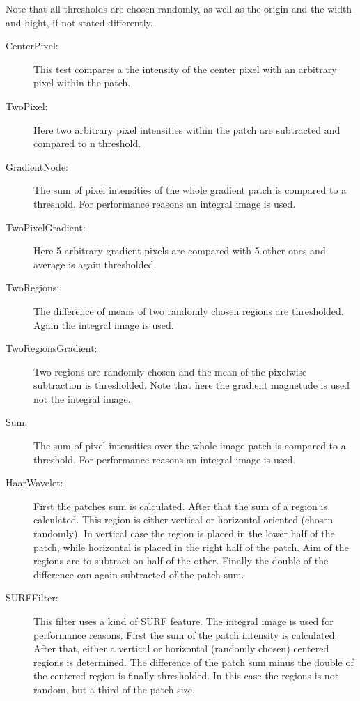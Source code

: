 Note that all thresholds are chosen randomly, as well as the origin and the width and hight, if not stated differently.

\FloatBarrier
\begin{description}
\item[CenterPixel:]
This test compares a the intensity of the center pixel with an arbitrary pixel within the patch.

\item[TwoPixel:]
Here two arbitrary pixel intensities within the patch are subtracted and compared to n threshold.

\item[GradientNode:]
The sum of pixel intensities of the whole gradient patch is compared to a threshold. For performance reasons an integral image is used. 

\item[TwoPixelGradient:]
Here 5 arbitrary gradient pixels are compared with 5 other ones and average is again thresholded.

\item[TwoRegions:]
The difference of means of two randomly chosen regions are thresholded. Again the integral image is used.

\item[TwoRegionsGradient:]
Two regions are randomly chosen and the mean of the pixelwise subtraction is thresholded. Note that here the gradient magnetude is used not the integral image.

\item[Sum:]
The sum of pixel intensities over the whole image patch is compared to a threshold. For performance reasons an integral image is used.

\item[HaarWavelet:]
First the patches sum is calculated. After that the sum of a region is calculated. This region is either vertical or horizontal oriented (chosen randomly). In vertical case the region is placed in the lower half of the patch, while horizontal is placed in the right half of the patch. Aim of the regions are to subtract on half of the other. Finally the double of the difference can again subtracted of the patch sum.

\item[SURFFilter:]
This filter uses a kind of SURF feature. The integral image is used for performance reasons. First the sum of the patch intensity is calculated. After that, either a vertical or horizontal (randomly chosen) centered regions is determined. The difference of the patch sum minus the double of the centered region is finally thresholded. In this case the regions is not random, but a third of the patch size.
\end{description}



